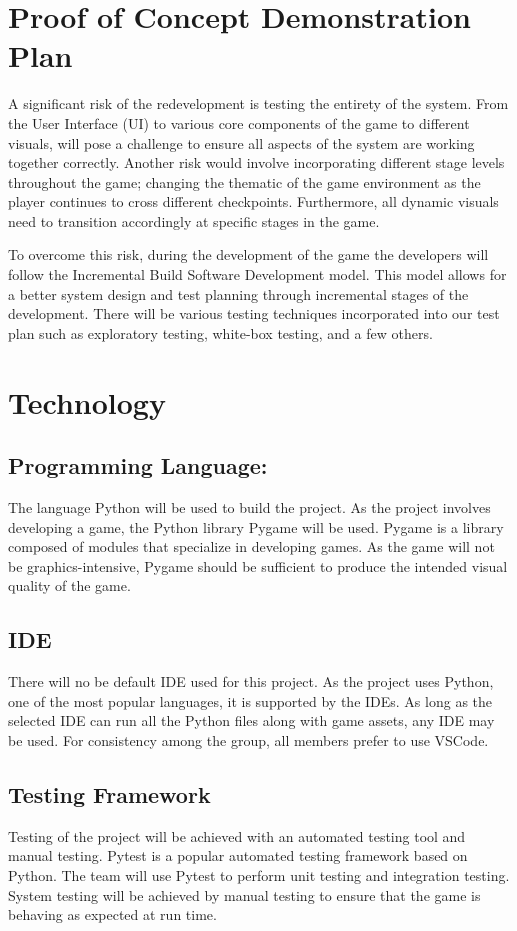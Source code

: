 \documentclass{article}
\begin{document}
\section{Proof of Concept Demonstration Plan}
A significant risk of the redevelopment is testing the entirety of the system. From the User Interface (UI) to various core components of the game to different visuals, will pose a challenge to ensure all aspects of the system are working together correctly. Another risk would involve incorporating different stage levels throughout the game; changing the thematic of the game environment as the player continues to cross different checkpoints. Furthermore, all dynamic visuals need to transition accordingly at specific stages in the game.  

To overcome this risk, during the development of the game the developers will follow the Incremental Build Software Development model. This model allows for a better system design and test planning through incremental stages of the development. There will be various testing techniques incorporated into our test plan such as exploratory testing, white-box testing, and a few others.

\section{Technology}
\subsection{Programming Language: }
The language Python will be used to build the project. As the project involves developing a game, the Python library Pygame will be used. Pygame is a library composed of modules that specialize in developing games. As the game will not be graphics-intensive, Pygame should be sufficient to produce the intended visual quality of the game.  

\subsection{IDE}
There will no be default IDE used for this project. As the project uses Python, one of the most popular languages, it is supported by the IDEs. As long as the selected IDE can run all the Python files along with game assets, any IDE may be used. For consistency among the group, all members prefer to use VSCode.

\subsection{Testing Framework}
Testing of the project will be achieved with an automated testing tool and manual testing. Pytest is a popular automated testing framework based on Python. The team will use Pytest to perform unit testing and integration testing. System testing will be achieved by manual testing to ensure that the game is behaving as expected at run time. 
\end{document}
